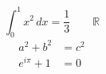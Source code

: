 \documentclass{article}
\begin{document}
\[ \int_0^1 x^2\,dx = \frac{1}{3} \qquad \mathbb{R} \]
\begin{align} a^2+b^2 &= c^2 \\ e^{i\pi}+1 &= 0 \end{align}
\end{document}
